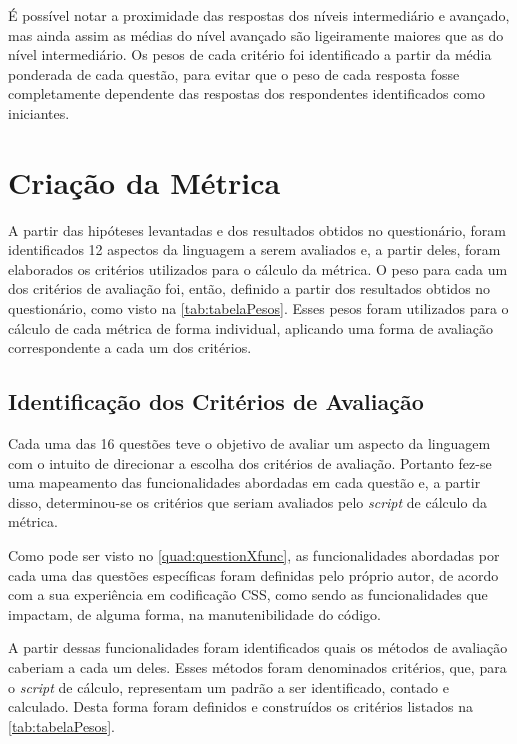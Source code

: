 É possível notar a proximidade das respostas dos níveis intermediário e avançado, mas ainda assim as médias do nível avançado são ligeiramente maiores que as do nível intermediário. Os pesos de cada critério foi identificado a partir da média ponderada de cada questão, para evitar que o peso de cada resposta fosse completamente dependente das respostas dos respondentes identificados como iniciantes.

\section{Criação da Métrica}
	
A partir das hipóteses levantadas e dos resultados obtidos no questionário, foram identificados 12 aspectos da linguagem a serem avaliados e, a partir deles, foram elaborados os critérios utilizados para o cálculo da métrica. O peso para cada um dos critérios de avaliação foi, então, definido a partir dos resultados obtidos no questionário, como visto na \autoref{tab:tabelaPesos}. Esses pesos foram utilizados para o cálculo de cada métrica de forma individual, aplicando uma forma de avaliação correspondente a cada um dos critérios.



\subsection{Identificação dos Critérios de Avaliação}
  
Cada uma das 16 questões teve o objetivo de avaliar um aspecto da linguagem com o intuito de direcionar a escolha dos critérios de avaliação. Portanto fez-se uma mapeamento das funcionalidades abordadas em cada questão e, a partir disso, determinou-se os critérios que seriam avaliados pelo \textit{script} de cálculo da métrica.

Como pode ser visto no \autoref{quad:questionXfunc}, as funcionalidades abordadas por cada uma das questões específicas foram definidas pelo próprio autor, de acordo com a sua experiência em codificação CSS, como sendo as funcionalidades que impactam, de alguma forma, na manutenibilidade do código.



A partir dessas funcionalidades foram identificados quais os métodos de avaliação caberiam a cada um deles. Esses métodos foram denominados critérios, que, para o \textit{script} de cálculo, representam um padrão a ser identificado, contado e calculado. Desta forma foram definidos e construídos os critérios listados na \autoref{tab:tabelaPesos}.

